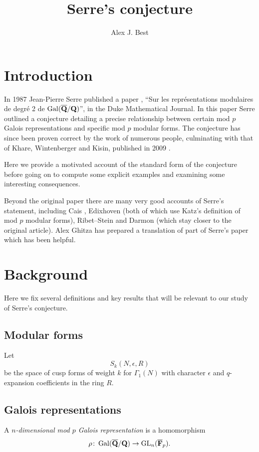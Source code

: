 \documentclass[a4paper,12pt]{article}
\title{Serre's conjecture} %
\author{Alex J. Best}
\begin{document}
\maketitle
\tableofcontents
\clearpage

\section{Introduction}
In 1987 Jean-Pierre Serre published a paper \cite{Serre87}, ``Sur les repr\'esentations modulaires de degr\'e 2 de $\operatorname{Gal}(\overline{\mathbf{Q}}/\mathbf{Q})$'', in the Duke Mathematical Journal.
In this paper Serre outlined a conjecture detailing a precise relationship between certain mod $p$ Galois representations and specific mod $p$ modular forms.
The conjecture has since been proven correct by the work of numerous people, culminating with that of Khare, Wintenberger and Kisin, published in 2009 \cite{KWI,KWII,Kisin}.

Here we provide a motivated account of the standard form of the conjecture before going on to compute some explicit examples and examining some interesting consequences.

Beyond the original paper there are many very good accounts of Serre's statement, including Cais \cite{Cais}, Edixhoven \cite{Edixhoven} (both of which use Katz's definition of mod $p$ modular forms), Ribet--Stein \cite{RibetStein} and Darmon \cite{Darmon} (which stay closer to the original article).
Alex Ghitza has prepared a translation of part of Serre's paper \cite{Ghitza} which has been helpful.


\section{Background}
Here we fix several definitions and key results that will be relevant to our study of Serre's conjecture.

\subsection{Modular forms}
\begin{defn}
Let
\[
S_k(N, \epsilon, R)
\]
be the space of cusp forms of weight $k$ for $\Gamma_1(N)$ with character $\epsilon$ and $q$-expansion coefficients in the ring $R$.
\end{defn}


\subsection{Galois representations}
\begin{defn}
A \emph{$n$-dimensional mod $p$ Galois representation} is a homomorphism
\[
\rho\colon \operatorname{Gal}(\overline{\mathbf{Q}}/\mathbf{Q}) \to \operatorname{GL}_n(\overline{\mathbf{F}}_p).
\]
\end{defn}
\end{document}
